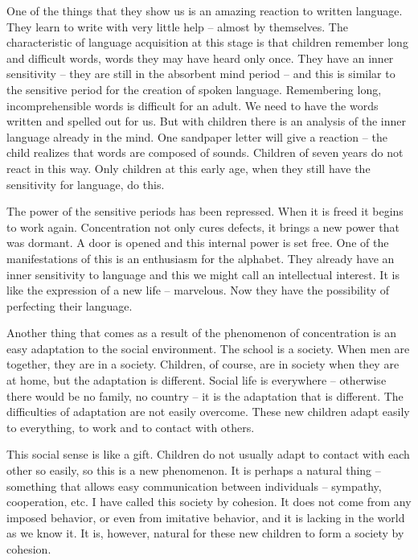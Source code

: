 \documentclass[lang=cn,10pt]{elegantbook}
\begin{document}
One of the things that they show us is an amazing reaction to written language. They learn to write with very little help – almost by themselves. The characteristic of language acquisition at this stage is that children remember long and difficult words, words they may have heard only once. They have an inner sensitivity – they are still in the absorbent mind period – and this is similar to the sensitive period for the creation of spoken language. Remembering long, incomprehensible words is difficult for an adult. We need to have the
words written and spelled out for us. But with children there is an analysis of the inner language already in the mind. One sandpaper letter will give a reaction – the child realizes that words are composed of sounds. Children of seven years do not react in this way. Only children at this early age, when they still have the sensitivity for language, do this.

The power of the sensitive periods has been repressed. When it is freed it begins to work again. Concentration not only cures defects, it brings a new power that was dormant. A door is opened and this internal power is set free. One of the manifestations of this is an enthusiasm for the alphabet. They already have an inner sensitivity to language and this we might call an intellectual interest. It is like the expression of a new life – marvelous. Now they have the possibility of perfecting their language.

Another thing that comes as a result of the phenomenon of concentration is an easy adaptation to the social environment. The school is a society. When men are together, they are in a society. Children, of course, are in society when they are at home, but the adaptation is different. Social life is everywhere – otherwise there would be no family, no country – it is the adaptation that is different. The difficulties of adaptation are not easily overcome. These new children adapt easily to everything, to work and to contact with others.

This social sense is like a gift. Children do not usually adapt to contact with each other so easily, so this is a new phenomenon. It is perhaps a natural thing – something that allows easy communication between individuals – sympathy, cooperation, etc. I have called this society by cohesion. It does not come from any imposed behavior, or even from imitative behavior, and it is lacking in the world as we know it. It is, however, natural for these new children to form a society by cohesion.
\end{document}
